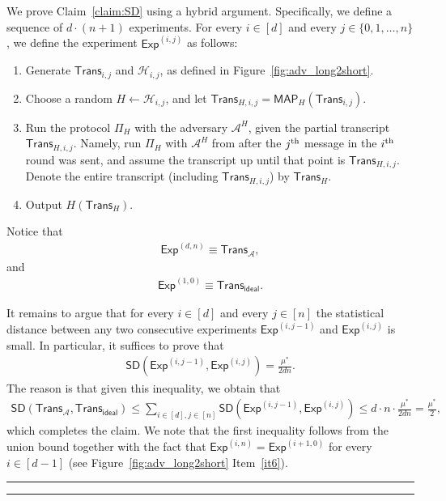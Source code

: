 \documentclass[11pt]{article}
\theoremstyle{plain}
\theoremstyle{definition}
\numberwithin{equation}{section}
\newcommand{\qedsymb}{\hfill{\rule{2mm}{2mm}}}
\renewenvironment{proof}{\begin{trivlist} \item[\hspace{\labelsep}{\bf
\noindent Proof.\/}] }{\qedsymb\end{trivlist}}
\numberwithin{equation}{section} \newcommand{\aka} {also known as\ }
\newcommand{\Hc}{\mathcal H}
\newcommand{\1}{\mathbf{1}}
\newcommand{\Adv}{\mathcal A}
\newcommand{\ith}[1]{{#1}\textsuperscript{th}}
\newcommand{\SD}{\mathsf{SD}}
\newcommand{\real}{\Adv}
\newcommand{\ideal}{\mathsf{ideal}}
\newcommand{\trans}{{\mathsf{Trans}}}
\newcommand{\Exp}{\mathsf{Exp}}
\newcommand{\MAP}{\mathsf{MAP}}
\theoremstyle{remark}
\begin{document}
\begin{proof}
\begin{proof}We prove Claim~\ref{claim:SD} using a hybrid argument. Specifically, we define
  a sequence of $d\cdot (n+1)$ experiments.  For every $i\in[d]$ and every
  $j\in\{0,1,\ldots,n\}$, we define the experiment $\Exp^{(i,j)}$ as follows:
  \begin{enumerate}
  \item Generate $\trans_{i,j}$ and $\Hc_{i,j}$, as defined in
    Figure~\ref{fig:adv_long2short}.
  \item\label{it:12} Choose a random $H\leftarrow \Hc_{i,j}$, and let
    $\trans_{H,i,j}=\MAP_H(\trans_{i,j})$.
  \item\label{it:13} Run the protocol $\Pi_H$ with the adversary $\Adv^H$, given
    the partial transcript $\trans_{H,i,j}$.  Namely, run $\Pi_H$ with $\Adv^H$ from after the $\ith{j}$ message in the $\ith{i}$ round was sent, and assume the transcript up until that point is $\trans_{H,i,j}$.  Denote the entire transcript
    (including $\trans_{H,i,j}$) by $\trans_H$.
  \item\label{it:14} Output $H(\trans_H)$.
  \end{enumerate}
  Notice that
  \begin{align*}
  \Exp^{(d,n)}\equiv \trans_\real,
  \end{align*}
  and
  \begin{align*}
    \Exp^{(1,0)}\equiv \trans_\ideal.
  \end{align*}

  It remains to argue that for every $i\in[d]$ and every $j\in[n]$ the
  statistical distance between any two consecutive experiments $\Exp^{(i,j-1)}$
  and $\Exp^{(i,j)}$ is small. In particular, it suffices to prove that
  \begin{align}\label{eq:hybrid}
    \SD\left(\Exp^{(i,j-1)}, \Exp^{(i,j)}\right) =\frac{\mu^*}{2dn}.
  \end{align}
The reason is that
given this inequality, we obtain that
  \begin{align*}
    \SD(\trans_{\real},\trans_{\ideal}) \leq \sum_{i\in[d],j\in[n]} \SD(\Exp^{(i,j-1)},
    \Exp^{(i,j)}) \leq d\cdot n \cdot\frac{\mu^*}{2dn}=\frac{\mu^*}{2},
  \end{align*}
   which completes the claim.  We note that the first inequality follows from the union bound together with the fact that $\Exp^{(i,n)}=\Exp^{(i+1,0)}$ for every $i\in[d-1]$ (see Figure~\ref{fig:adv_long2short} Item~\ref{it6}).\\


\end{proof}
\end{proof}
\end{document}
